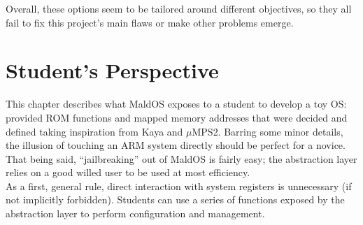 \documentclass[12pt,a4paper,openright,twoside]{report}
\begin{document}
Overall, these options seem to be tailored around different objectives, so they
all fail to fix this project's main flaws or make other problems emerge.


\clearpage{\pagestyle{empty}\cleardoublepage}
\chapter{Student's Perspective}
This chapter describes what MaldOS exposes to a student to develop a toy OS:
provided ROM functions and mapped memory addresses that were decided and defined
taking inspiration from Kaya and $\mu$MPS2.
Barring some minor details, the illusion of touching an ARM system directly should
be perfect for a novice. That being said, ``jailbreaking'' out of MaldOS is 
fairly easy; the abstraction layer relies on a good willed user to be used at 
most efficiency.\\
As a first, general rule, direct interaction with system registers is
unnecessary (if not implicitly forbidden). Students can use a series of functions
exposed by the abstraction layer to perform configuration and management.
\end{document}
